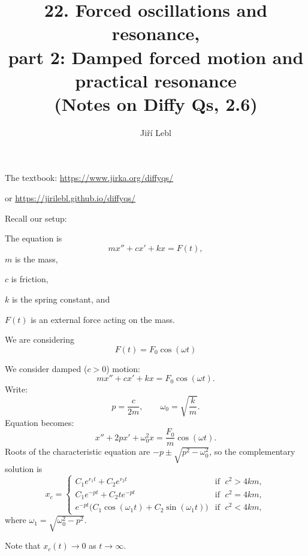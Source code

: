 \documentclass[10pt,aspectratio=169]{beamer}
\author{Ji\v{r}\'i Lebl}
\institute[OSU]{%
Oklahoma State University%
}
\title{22. Forced oscillations and resonance, \\part 2: Damped forced motion
and practical resonance\\(Notes on Diffy Qs, 2.6)}
\date{}
\begin{document}
\begin{frame}
\titlepage


\begin{center}
The textbook: \url{https://www.jirka.org/diffyqs/}

or \url{https://jirilebl.github.io/diffyqs/}
\end{center}
\end{frame}

\begin{frame}
Recall our setup:

\medskip

\hfill{}\hspace*{\fill}

\medskip
\pause

The equation is
\[
mx'' + cx' + kx = F(t) ,
\]
$m$ is the mass,

$c$ is friction,

$k$ is the spring constant, and

$F(t)$ is an external force acting on the mass.

\medskip
\pause

We are considering
\[
F(t) = F_0 \cos (\omega t)
\]
\end{frame}

\begin{frame}
We consider damped ($c > 0$) motion:
\[
mx'' + cx' + kx = F_0 \cos (\omega t) .
\]
\pause
Write:
\vspace*{-9pt}
\[
p = \frac{c}{2m},  \qquad \omega_0 = \sqrt{\frac{k}{m}} .
\]
Equation becomes:
\vspace*{-4pt}
\[
x'' + 2px' + \omega_0^2x = \frac{F_0}{m} \cos (\omega t) .
\]
\pause
Roots of the characteristic equation are
$-p \pm \sqrt{p^2 - \omega_0^2}$, so the complementary solution is
\[
x_c =
\begin{cases}
C_1 e^{r_1 t} + C_2 e^{r_2 t} & \text{if } \; c^2 > 4km , \\
C_1 e^{-p t} + C_2 t e^{-p t} & \text{if } \; c^2 = 4km , \\
e^{-p t} \bigl( C_1 \cos (\omega_1 t) + C_2 \sin (\omega_1 t) \bigr) &
  \text{if } \; c^2 < 4km ,
\end{cases}
\]
where $\omega_1 = \sqrt{\omega_0^2 - p^2}$.

\medskip
\pause

Note that
$x_c(t) \to 0$ as $t \to \infty$.
\end{frame}
\end{document}
